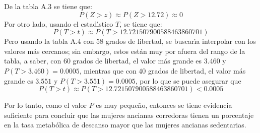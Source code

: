 \begin{solucion}
 \begin{valorp}
  De la tabla A.3 se tiene que:
  \begin{equation*}
   P(Z > z) \approx P(Z > 12.72) \approx 0 
  \end{equation*}
  Por otro lado, usando el estad\'{\i}stico $T$, se tiene que:
  \begin{equation*}
   P(T > t) \approx P(T > 12.721507900588463860701)
  \end{equation*}
  Pero usando la tabla A.4 con 58 grados de libertad,
  se buscar\'{\i}a interpolar con los valores m\'as cercanos;
  sin embargo, estos est\'an muy por afuera del rango de la tabla,
  a saber, con $60$ grados de libertad,
  el valor m\'as grande es $3.460$
  y $P(T > 3.460) = 0.0005$,
  mientras que con $40$ grados de libertad,
  el valor m\'as grande es $3.551$
  y $P(T > 3.551) = 0.0005$, por lo que se puede asegurar que
  \begin{equation*}
   P(T > t) \approx P(T > 12.721507900588463860701) < 0.0005
  \end{equation*}
 \end{valorp}

 \begin{conclusion}
  Por lo tanto, como el valor $P$ es muy peque\~no, entonces se tiene evidencia suficiente para concluir que las mujeres ancianas corredoras tienen un porcentaje en la tasa metab\'olica de descanso mayor que las mujeres ancianas sedentarias.
 \end{conclusion}


\end{solucion}

